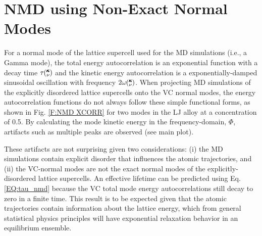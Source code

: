 \documentclass[aps,prb,onecolumn,preprint,footinbib,superscriptaddress,amsmath,amssymb,floatfix]{revtex4}
\newcommand{\kv}{\mspace{-4.0mu}\left(\mspace{-8.0mu}
\begin{smallmatrix}&\pmb{\kappa} \\&\nu\end{smallmatrix}
\mspace{-3.0mu}\right)}
\begin{document}

\section{\label{A:NMD XCORR}
NMD using Non-Exact Normal Modes}

For a normal mode of the lattice supercell 
used for the MD simulations (i.e., a Gamma mode), 
the total energy autocorrelation is an exponential function  
with a decay time $\tau\kv$ and the kinetic energy autocorrelation is a 
exponentially-damped sinusoidal oscillation with frequency 
$2\omega\kv$.\cite{mcgaughey_predicting_2013} 
When projecting MD simulations  
of the explicitly disordered lattice supercells 
onto the VC normal modes, 
the energy autocorrelation functions 
do not always follow these simple functional forms, 
as shown in Fig. \ref{F:NMD XCORR} for two modes in the LJ alloy at a 
concentration of 0.5.  
By calculating the mode kinetic energy in the  
frequency-domain, $\Phi$,\cite{larkin_comparison_2012} artifacts such as 
multiple peaks are observed (see main plot).   

These artifacts are not surprising given two considerations: 
(i) the MD simulations 
contain explicit disorder that influences the atomic trajectories, 
and (ii) the VC-normal modes are not the exact normal modes of the 
explicitly-disordered lattice supercells. 
An effective lifetime can be predicted 
using Eq. \eqref{EQ:tau_nmd} 
because the VC total mode energy autocorrelations 
still decay to zero in a finite time. This result is to be expected 
given that the atomic trajectories contain 
information about the lattice energy, which from general statistical 
physics principles will have exponential relaxation behavior in an 
equilibrium ensemble.
\cite{landau_statistical_1980,srivastava_physics_1990,rajabpour_thermal_2010}
\end{document}
